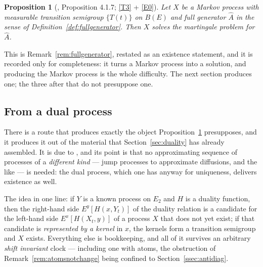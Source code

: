 \documentclass[11pt,a4paper]{article}
\theoremstyle{plain}
\newtheorem{proposition}[theorem]{Proposition}
\theoremstyle{definition}
\theoremstyle{remark}
\newcommand{\Bdd}{B}                           %
\newcommand{\DGP}{\cite{DGP24}}
\newcommand{\EK}{\cite{EK86}}
\begin{document}
\begin{proposition}[\EK, Proposition 4.1.7; \eqref{T3} + \eqref{E0}]
  \label{prop:exsemigroup}
  Let $X$ be a Markov process with measurable transition semigroup
  $\{T(t)\}$ on $\Bdd(E)$ and full generator $\hat{A}$ in the sense of
  Definition~\ref{def:fullgenerator}.  Then $X$ solves the martingale problem for
  $\hat{A}$.
\end{proposition}

This is Remark~\ref{rem:fullgenerator}, restated as an existence statement, and it
is recorded only for completeness: it turns a Markov process into a solution, and
producing the Markov process is the whole difficulty.  The next section produces
one; the three after that do not presuppose one.

\subsection{From a dual process}
\label{ssec:exduality}

There is a route that produces exactly the object
Proposition~\ref{prop:exsemigroup} presupposes, and it produces it out of the
material that Section~\ref{sec:duality} has already assembled.  It is due to
\DGP, and its point is that no approximating sequence of processes of a
\emph{different kind} --- jump processes to approximate diffusions, and the like
--- is needed: the dual process, which one has anyway for uniqueness, delivers
existence as well.

The idea in one line: if $Y$ is a known process on $E_2$ and $H$ is a duality
function, then the right-hand side $E^y[H(x,Y_t)]$ of the duality relation is a
candidate for the left-hand side $E^x[H(X_t,y)]$ of a process $X$ that does not
yet exist; if that candidate is \emph{represented by a kernel} in $x$, the
kernels form a transition semigroup and $X$ exists.  Everything else is
bookkeeping, and all of it survives an arbitrary \emph{shift invariant} clock ---
including one with atoms, the obstruction of Remark~\ref{rem:atomsnotchange} being
confined to Section~\ref{ssec:antidiag}.
\end{document}
